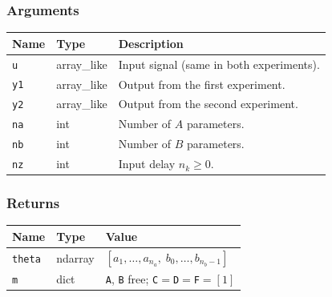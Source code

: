 \documentclass[../main]{subfiles}
\begin{document}
\subsubsection*{Arguments}
\begin{center}
\begin{tabular}{lll}
  \toprule
  Name & Type & Description \\
  \midrule
  \texttt{u}  & array\_like & Input signal (same in both experiments). \\
  \texttt{y1} & array\_like & Output from the first experiment. \\
  \texttt{y2} & array\_like & Output from the second experiment. \\
  \texttt{na} & int & Number of $A$ parameters. \\
  \texttt{nb} & int & Number of $B$ parameters. \\
  \texttt{nz} & int & Input delay $n_k \geq 0$. \\
  \bottomrule
\end{tabular}
\end{center}

\subsubsection*{Returns}
\begin{center}
\begin{tabular}{lll}
  \toprule
  Name & Type & Value \\
  \midrule
  \texttt{theta} & ndarray & $[a_1,\ldots,a_{n_a},\; b_0,\ldots,b_{n_b-1}]$ \\
  \texttt{m}     & dict    & \texttt{A}, \texttt{B} free; \texttt{C}$=$\texttt{D}$=$\texttt{F}$=[1]$ \\
  \bottomrule
\end{tabular}
\end{center}
\end{document}
